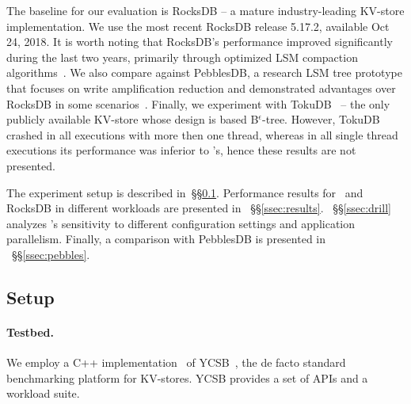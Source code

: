 The baseline for our evaluation is RocksDB -- a mature industry-leading KV-store implementation. 
We use the most recent RocksDB release 5.17.2, available Oct 24, 2018.  
It is worth noting that RocksDB's performance improved significantly during the last two years, primarily through 
optimized LSM compaction algorithms~\cite{CallaghanCompaction}.   We also compare against PebblesDB, 
a research LSM tree prototype that focuses on write amplification reduction and demonstrated advantages
over RocksDB in some scenarios~\cite{PebblesDB}. Finally, we experiment with TokuDB~\cite{TokuDB} -- 
the only publicly available KV-store whose design is based B$^\epsilon$-tree. However, TokuDB crashed 
in all executions with more then one thread, whereas in all single thread executions its performance was 
inferior to \sys's, hence these results are not presented.

The experiment setup is described in~\S\S\ref{ssec:setup}. 
Performance results for \sys\ and RocksDB in 
different workloads are presented in ~\S\S\ref{ssec:results}. 
~\S\S\ref{ssec:drill} analyzes \sys's sensitivity to different configuration settings and application parallelism. 
Finally, a comparison with PebblesDB is presented in ~\S\S\ref{ssec:pebbles}.
 

\subsection{Setup}
\label{ssec:setup} 

\paragraph{Testbed.} We employ a C++ implementation~\cite{Cpp-YCSB} of YCSB~\cite{YCSB}, the  de facto standard  
benchmarking platform for KV-stores. 
YCSB provides a set of APIs and a workload suite. 

